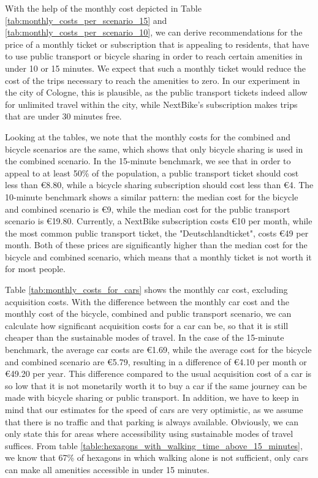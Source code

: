 With the help of the monthly cost depicted in Table \ref{tab:monthly_costs_per_scenario_15} and \ref{tab:monthly_costs_per_scenario_10}, we can derive recommendations for the price of a monthly ticket or subscription that is appealing to residents, that have to use public transport or bicycle sharing in order to reach certain amenities in under 10 or 15 minutes.
We expect that such a monthly ticket would reduce the cost of the trips necessary to reach the amenities to zero.
In our experiment in the city of Cologne, this is plausible, as the public transport tickets indeed allow for unlimited travel within the city, while NextBike's subscription makes trips that are under 30 minutes free.

Looking at the tables, we note that the monthly costs for the combined and bicycle scenarios are the same, which shows that only bicycle sharing is used in the combined scenario.
In the 15-minute benchmark, we see that in order to appeal to at least 50\% of the population, a public transport ticket should cost less than \euro{8.80}, while a bicycle sharing subscription should cost less than \euro{4}.
The 10-minute benchmark shows a similar pattern: the median cost for the bicycle and combined scenario is \euro{9}, while the median cost for the public transport scenario is \euro{19.80}.
Currently, a NextBike subscription costs \euro{10} per month, while the most common public transport ticket, the "Deutschlandticket", costs \euro{49} per month.
Both of these prices are significantly higher than the median cost for the bicycle and combined scenario, which means that a monthly ticket is not worth it for most people.

Table \ref{tab:monthly_costs_for_cars} shows the monthly car cost, excluding acquisition costs.
With the difference between the monthly car cost and the monthly cost of the bicycle, combined and public transport scenario, we can calculate how significant acquisition costs for a car can be, so that it is still cheaper than the sustainable modes of travel.
In the case of the 15-minute benchmark, the average car costs are \euro{1.69}, while the average cost for the bicycle and combined scenario are \euro{5.79}, resulting in a difference of \euro{4.10} per month or \euro{49.20} per year.
This difference compared to the usual acquisition cost of a car is so low that it is not monetarily worth it to buy a car if the same journey can be made with bicycle sharing or public transport.
In addition, we have to keep in mind that our estimates for the speed of cars are very optimistic, as we assume that there is no traffic and that parking is always available.
Obviously, we can only state this for areas where accessibility using sustainable modes of travel suffices.
From table \ref{table:hexagons_with_walking_time_above_15_minutes}, we know that 67\% of hexagons in which walking alone is not sufficient, only cars can make all amenities accessible in under 15 minutes.



